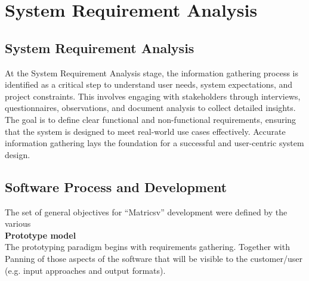 \chapter{System Requirement Analysis}


\section{System Requirement Analysis}

 At the System Requirement Analysis stage, the information gathering process is identified as a critical step to understand user needs, system expectations, and project constraints. This involves engaging with stakeholders through interviews, questionnaires, observations, and document analysis to collect detailed insights. The goal is to define clear functional and non-functional requirements, ensuring that the system is designed to meet real-world use cases effectively. Accurate information gathering lays the foundation for a successful and user-centric system design.





\section{Software Process and Development}
The set of general objectives for “Matricsv” development were defined by the various \\
\textbf{Prototype model}\\

The prototyping paradigm begins with requirements gathering. Together with Panning of those aspects of the software that will be visible to the customer/user (e.g. input approaches and output formats).

